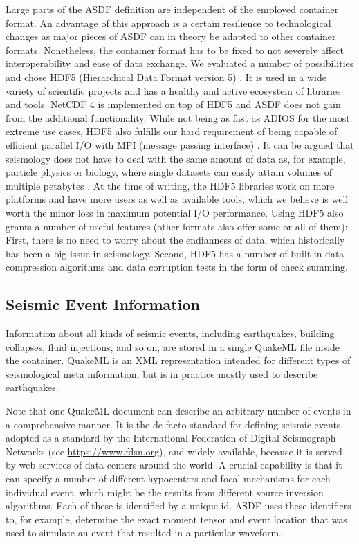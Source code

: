 Large parts of the ASDF definition are independent of the employed container
format. An advantage of this approach is a certain resilience to technological
changes as major pieces of ASDF can in theory be adapted to other container
formats. Nonetheless, the container format has to be fixed to not severely
affect interoperability and ease of data exchange. We evaluated a number of
possibilities and chose HDF5 (Hierarchical Data Format version 5) \cite{hdf5}.
It is used in a wide variety of scientific projects and has a healthy and
active ecosystem of libraries and tools. NetCDF 4 \cite{netcdf} is implemented
on top of HDF5 and ASDF does not gain from the additional functionality. While
not being as fast as ADIOS \cite{liu2014hello} for the most extreme use cases, HDF5
also fulfills our hard requirement of being capable of efficient parallel I/O
with MPI (message passing interface) \cite{MPI}. It can be argued that
seismology does not have to deal with the same amount of data as, for example,
particle physics or biology, where single datasets can easily attain volumes of
multiple petabytes \cite{cern_report, big_data_biology}.  At the time of
writing, the HDF5 libraries work on more platforms and have more users as well
as available tools, which we believe is well worth the minor loss in maximum
potential I/O performance. Using HDF5 also grants a number of useful features
(other formats also offer some or all of them): First, there is no need to
worry about the endianness of data, which historically has been a big issue in
seismology. Second, HDF5 has a number of built-in data compression algorithms
and data corruption tests in the form of check summing.

\subsection{Seismic Event Information}

Information about all kinds of seismic events, including earthquakes, building
collapses, fluid injections, and so on, are stored in a single QuakeML
\cite{quakeml_orfeus_newsletter, Schorlemmer2011} file inside the container.
QuakeML is an XML \cite{xml_spec} representation intended for different types
of seismological meta information, but is in practice mostly used to describe
earthquakes.

Note that one QuakeML document can describe an arbitrary number of events in a
comprehensive manner. It is the de-facto standard for defining seismic events,
adopted as a standard by the International Federation of Digital Seismograph
Networks (see \url{https://www.fdsn.org}), and widely available, because it
is served by web services of data centers around the world. A crucial
capability is that it can specify a number of different hypocenters and focal
mechanisms for each individual event, which might be the results from different
source inversion algorithms. Each of these is identified by a unique id. ASDF
uses these identifiers to, for example, determine the exact moment tensor and
event location that was used to simulate an event that resulted in a particular
waveform.

